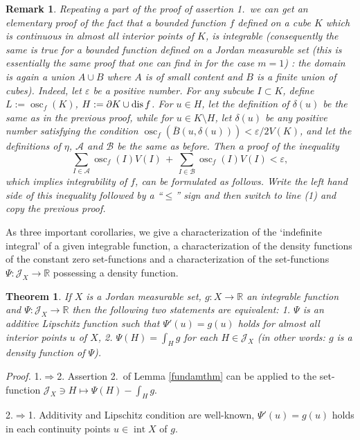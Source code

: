 \documentclass{article}
\newcommand{\proof}[1]{\textit{Proof. }#1}
\newtheorem{theorem}{Theorem}
\newtheorem{remark}{Remark}
\newcommand{\ir}{\mathop{\mathrm{int}}\nolimits}
\newcommand{\osc}{\mathop{\mathrm{osc}}\nolimits}
\newcommand{\R}{\ensuremath{\mathbb R}}
\newcommand{\J}{\mathscr{J}}
\newcommand{\ee}{\varepsilon}
\newcommand{\bol}{$\Rightarrow$}
\newcommand{\ol}{\overline}
\begin{document}
\begin{remark}
Repeating a part of the proof of assertion 1.~we can get an
elementary proof of the fact that a bounded function $f$ defined
on a cube $K$ which is continuous in almost all interior points of
$K$, is integrable (consequently the same is true for a bounded
function defined on a Jordan measurable set (this is essentially
the same proof that one can find in \cite[Theorem 4]{Botsko:89}
for the case
$m=1$) : the domain is again a union $A\cup B$ where $A$ is of
small content and $B$ is a finite union of cubes). Indeed, let $
\varepsilon $ be a positive number. For any subcube $ I\subset K$,
define $L:=\osc_f(K)$, $H:=\partial K\cup\mbox{dis\,}f$. For
$ u\in H $, let the
definition of $\delta(u)$ be the same as in the previous proof,
while for $ u\in K\setminus H $, let $\delta(u)$ be any positive
number satisfying the condition $
\osc_f(\ol{B}(u,\delta(u)))<\ee/2V(K) $, and let the definitions
of $ \eta $, $\mathcal{A}$ and $\mathcal{B}$ be the same as
before. Then a proof of the inequality
\[\sum_{I\in\mathcal{A}}\osc_f(I)V(I)\,+\,\sum_{I\in\mathcal{B}}\osc_f(I)V(I)<
\varepsilon,\]
which implies integrability of $f$, can be formulated as follows.
Write the left hand side of this inequality followed by a ``$ \le
$'' sign and then switch to  line (1) and copy the previous
proof.\end{remark}

As three important corollaries, we give a characterization of the
`indefinite integral' of a given integrable function, a
characterization of the density functions of the constant zero
set-functions and a characterization of the set-functions
$\Psi\colon\J_X\to\R$ possessing a density function.

\begin{theorem}\label{charofintg}
If $X$ is a Jordan measurable set, $g:X\to\R$ an integrable
function and $ \Psi\colon\J_X\to\R$ then the following two
statements are equivalent: 1. $\Psi$ is an additive Lipschitz
function such that $ \Psi'(u)=g(u) $ holds for almost all interior
points $u$ of $X$, 2. $ \Psi(H)=\int_Hg $ for each $ H\in \J_X$
(in other words: $g$ is a density function of $\Psi$).
\end{theorem}

\proof{ 1.\bol2. Assertion 2.~of Lemma \ref{fundamthm} can be applied
to the set-function $ \J_X\ni H\mapsto \Psi(H)-\int_Hg$.

2.\bol1. Additivity and Lipschitz condition are well-known,
$\Psi'(u)=g(u)$ holds in each continuity points $u\in\ir X$ of
$g$.
}%
\end{document}
